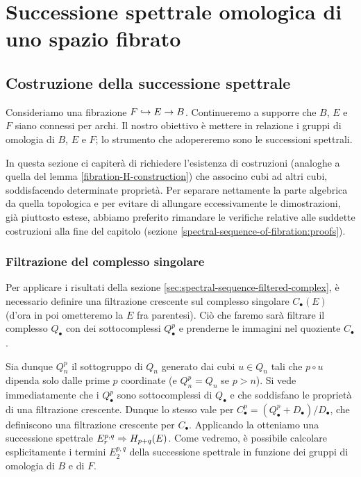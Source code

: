 \chapter{Successione spettrale omologica di uno spazio fibrato}
\label{ch:homological-spectral-sequence-of-fibration}
\section{Costruzione della successione spettrale}
Consideriamo una fibrazione \(F\hookrightarrow E\to B\). Continueremo a supporre che \(B\), \(E\) e \(F\) siano connessi per archi. Il nostro obiettivo è mettere in relazione i gruppi di omologia di \(B\), \(E\) e \(F\); lo strumento che adopereremo sono le successioni spettrali.

In questa sezione ci capiterà di richiedere l'esistenza di costruzioni (analoghe a quella del lemma \ref{fibration-H-construction}) che associno cubi ad altri cubi, soddisfacendo determinate proprietà. Per separare nettamente la parte algebrica da quella topologica e per evitare di allungare eccessivamente le dimostrazioni, già piuttosto estese, abbiamo preferito rimandare le verifiche relative alle suddette costruzioni alla fine del capitolo (sezione \ref{spectral-sequence-of-fibration:proofs}).

\subsection{Filtrazione del complesso singolare}
Per applicare i risultati della sezione \ref{sec:spectral-sequence-filtered-complex}, è necessario definire una filtrazione crescente sul complesso singolare \(C_\bullet(E)\) (d'ora in poi ometteremo la \(E\) fra parentesi). Ciò che faremo sarà filtrare il complesso \(Q_\bullet\) con dei sottocomplessi \(Q^p_\bullet\) e prenderne le immagini nel quoziente \(C_\bullet\).

Sia dunque \(Q^p_n\) il sottogruppo di \(Q_n\) generato dai cubi \(u\in Q_n\) tali che \(p\circ u\) dipenda solo dalle prime \(p\) coordinate (e \(Q^p_n=Q_n\) se \(p>n\)). Si vede immediatamente che i \(Q^p_\bullet\) sono sottocomplessi di \(Q_\bullet\) e che soddisfano le proprietà di una filtrazione crescente. Dunque lo stesso vale per \(C^p_\bullet=(Q^p_\bullet+D_\bullet)/D_\bullet\), che definiscono una filtrazione crescente per \(C_\bullet\). Applicando la  otteniamo una successione spettrale \(E^{p,q}_r\Rightarrow H_{p+q}(E)\). Come vedremo, è possibile calcolare esplicitamente i termini \(E^{p,q}_2\) della successione spettrale in funzione dei gruppi di omologia di \(B\) e di \(F\).

